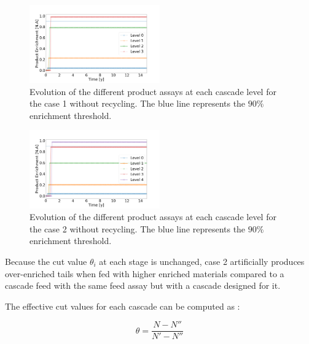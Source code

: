 \documentclass{anstrans}
\begin{document}
\begin{figure}[ht] %
  \centering
  \includegraphics[width=0.5\textwidth]{assay_case_1_no_rec.png}
  \caption{Evolution of the different product assays at each cascade level for
  the case 1 without recycling. The blue line represents the $90\%$ enrichment
  threshold.}\label{fig:assay_c1_nr}
\end{figure}
\begin{figure}[ht] %
  \centering
  \includegraphics[width=0.5\textwidth]{assay_case_2_no_rec.png}
  \caption{Evolution of the different product assays at each cascade level for
  the case 2 without recycling. The blue line represents the $90\%$ enrichment
  threshold.}\label{fig:assay_c2_nr}
\end{figure}

Because the cut value $\theta_i$ at each stage is unchanged, case 2 artificially
produces over-enriched tails when fed with higher enriched materials compared
to a cascade feed with the same feed assay but with a cascade designed for it.


The effective cut values for each cascade can be computed as :

\begin{equation}\label{eq:theta_eff}
    \theta = \dfrac{N - N''}{N'-N''}
\end{equation}
\end{document}

